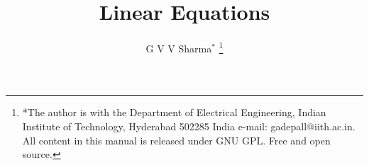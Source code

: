 \documentclass[journal,12pt,twocolumn]{IEEEtran}
\begin{document}
\let\StandardTheFigure\thefigure
\let\vec\mathbf
\renewcommand{\thefigure}{\theproblem}



\def\putbox#1#2#3{\makebox[0in][l]{\makebox[#1][l]{}\raisebox{\baselineskip}[0in][0in]{\raisebox{#2}[0in][0in]{#3}}}}
     \def\rightbox#1{\makebox[0in][r]{#1}}
     \def\centbox#1{\makebox[0in]{#1}}
     \def\topbox#1{\raisebox{-\baselineskip}[0in][0in]{#1}}
     \def\midbox#1{\raisebox{-0.5\baselineskip}[0in][0in]{#1}}

\vspace{3cm}

\title{
	Linear Equations
}
\author{ G V V Sharma$^{*}$%
	\thanks{*The author is with the Department
		of Electrical Engineering, Indian Institute of Technology, Hyderabad
		502285 India e-mail:  gadepall@iith.ac.in. All content in this manual is released under GNU GPL.  Free and open source.}
	
}	


%
%
%

% 
%
\end{document}

